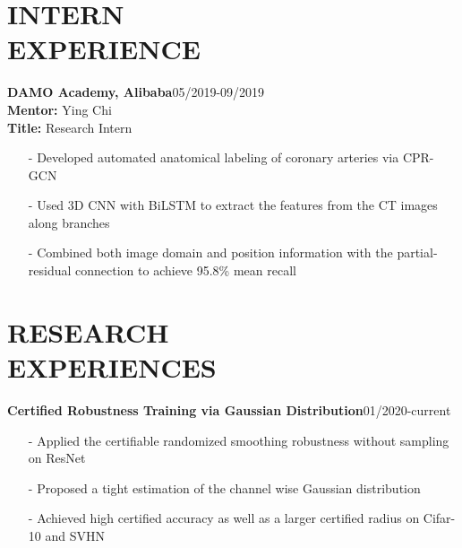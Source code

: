\documentclass[margin]{res}
\begin{document}
\begin{resume}
\section{INTERN \\ EXPERIENCE}
                \textbf{DAMO Academy, Alibaba}\hfill 05/2019-09/2019\\
                \textbf{Mentor:} Ying Chi\\
                \textbf{Title:} Research Intern
                \begin{itemize}\itemsep -2.2pt %
                 \item[-] Developed automated anatomical labeling of coronary arteries via CPR-GCN
                 \item[-] Used 3D CNN with BiLSTM to extract the features from the CT images along branches
                 \item[-] Combined both image domain and position information with the partial-residual connection to achieve 95.8\% mean recall
                 \end{itemize}

\section{RESEARCH \\ EXPERIENCES}
                \textbf{Certified Robustness Training via Gaussian Distribution}\hfill 01/2020-current
                \begin{itemize}\itemsep -2.2pt %
                 \item[-] Applied the certifiable randomized smoothing robustness without sampling on ResNet
                 \item[-] Proposed a tight estimation of the channel wise Gaussian distribution
                 \item[-] Achieved high certified accuracy as well as a larger certified radius on Cifar-10 and SVHN
                 \end{itemize}


\end{resume}
\end{document}
